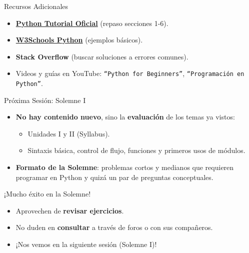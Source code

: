 \documentclass[10pt]{beamer}
\begin{document}
\begin{frame}{Recursos Adicionales}
  \begin{itemize}
    \item \href{https://docs.python.org/3/tutorial/}{\textbf{Python Tutorial Oficial}} (repaso secciones 1-6).
    \item \href{https://www.w3schools.com/python/}{\textbf{W3Schools Python}} (ejemplos básicos).
    \item \textbf{Stack Overflow} (buscar soluciones a errores comunes).
    \item Videos y guías en YouTube: \texttt{“Python for Beginners”}, \texttt{“Programación en Python”}.
  \end{itemize}
\end{frame}

\begin{frame}{Próxima Sesión: Solemne I}
  \begin{itemize}
    \item \textbf{No hay contenido nuevo}, sino la \textbf{evaluación} de los temas ya vistos:
      \begin{itemize}
        \item Unidades I y II (Syllabus).
        \item Sintaxis básica, control de flujo, funciones y primeros usos de módulos.
      \end{itemize}
    \item \textbf{Formato de la Solemne}: problemas cortos y medianos que requieren programar en Python y quizá un par de preguntas conceptuales.
  \end{itemize}
\end{frame}

\begin{frame}
  \Huge{\centerline{¡Mucho éxito en la Solemne!}}
  \vspace{0.4cm}
  \normalsize
  \begin{itemize}
    \item Aprovechen de \textbf{revisar ejercicios}.
    \item No duden en \textbf{consultar} a través de foros o con sus compañeros.
    \item ¡Nos vemos en la siguiente sesión (Solemne I)!
  \end{itemize}
\end{frame}
\end{document}
